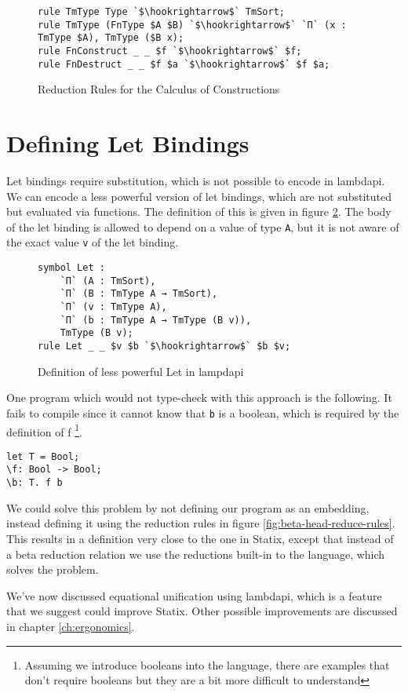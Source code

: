 \begin{figure}[ht]
	\begin{lstlisting}
rule TmType Type `$\hookrightarrow$` TmSort;
rule TmType (FnType $A $B) `$\hookrightarrow$` `Π` (x : TmType $A), TmType ($B x);
rule FnConstruct _ _ $f `$\hookrightarrow$` $f;
rule FnDestruct _ _ $f $a `$\hookrightarrow$` $f $a;
	\end{lstlisting}
	\caption{Reduction Rules for the Calculus of Constructions}
	\label{fig:lp-rules}
\end{figure}

\section{\label{ch:comp-lambdapi:let}Defining Let Bindings}

Let bindings require substitution, which is not possible to encode in lambdapi. We can encode a less powerful version of let bindings, which are not substituted but evaluated via functions. The definition of this is given in figure \ref{fig:lp-let}. The body of the let binding is allowed to depend on a value of type \verb|A|, but it is not aware of the exact value \verb|v| of the let binding. 

\begin{figure}[ht]
	\begin{lstlisting}
symbol Let : 
	`Π` (A : TmSort), 
	`Π` (B : TmType A → TmSort), 
	`Π` (v : TmType A),
	`Π` (b : TmType A → TmType (B v)),
	TmType (B v);
rule Let _ _ $v $b `$\hookrightarrow$` $b $v;
	\end{lstlisting}
	\caption{Definition of less powerful Let in lampdapi}
	\label{fig:lp-let}
\end{figure}

One program which would not type-check with this approach is the following. It fails to compile since it cannot know that \verb|b| is a boolean, which is required by the definition of f \footnote{Assuming we introduce booleans into the language, there are examples that don't require booleans but they are a bit more difficult to understand}.
\begin{lstlisting}
let T = Bool;
\f: Bool -> Bool;
\b: T. f b
\end{lstlisting}

We could solve this problem by not defining our program as an embedding, instead defining it using the reduction rules in figure \ref{fig:beta-head-reduce-rules}. This results in a definition very close to the one in Statix, except that instead of a beta reduction relation we use the reductions built-in to the language, which solves the problem. 

We've now discussed equational unification using lambdapi, which is a feature that we suggest could improve Statix. Other possible improvements are discussed in chapter \ref{ch:ergonomics}.